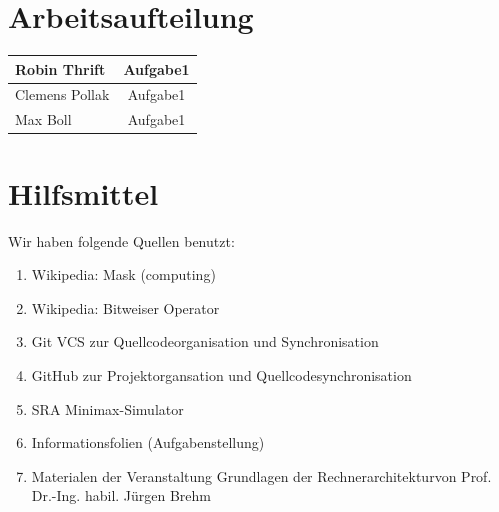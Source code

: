 \documentclass[12pt,titlepage]{article}
\begin{document}
\section{Arbeitsaufteilung}

\begin{tabular} { |l||c| }
\hline
Robin Thrift & Aufgabe1 \\
\hline
Clemens Pollak & Aufgabe1 \\
\hline
Max Boll & Aufgabe1 \\
\hline
\end{tabular}

\section{Hilfsmittel}
Wir haben folgende Quellen benutzt:
\begin{enumerate} 
\item Wikipedia: \dq Mask (computing)\dq \\ 
\item Wikipedia: \dq Bitweiser Operator\dq \\ 
\item Git VCS zur Quellcodeorganisation und Synchronisation
\item GitHub zur Projektorgansation und Quellcodesynchronisation
\item SRA Minimax-Simulator
\item Informationsfolien (Aufgabenstellung)
\item Materialen der Veranstaltung \dq Grundlagen der Rechnerarchitektur\dq von Prof. Dr.-Ing. habil. Jürgen Brehm
\end{enumerate}
\end{document}
